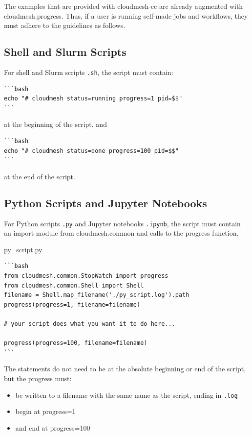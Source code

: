 The examples that are provided with cloudmesh-cc are already augmented
with cloudmesh.progress. Thus, if a user is running self-made jobs and
workflows, they must adhere to the guidelines as follows.

\subsection{Shell and Slurm Scripts}\label{shell-and-slurm-scripts}

For shell and Slurm scripts \texttt{.sh}, the script must contain:

\begin{verbatim}
```bash
echo "# cloudmesh status=running progress=1 pid=$$"
```
\end{verbatim}

at the beginning of the script, and

\begin{verbatim}
```bash
echo "# cloudmesh status=done progress=100 pid=$$"
```
\end{verbatim}

at the end of the script.

\subsection{Python Scripts and Jupyter
Notebooks}\label{python-scripts-and-jupyter-notebooks}

For Python scripts \texttt{.py} and Jupyter notebooks \texttt{.ipynb},
the script must contain an import module from cloudmesh.common and calls
to the progress function.

py\_script.py

\begin{verbatim}
```bash
from cloudmesh.common.StopWatch import progress
from cloudmesh.common.Shell import Shell
filename = Shell.map_filename('./py_script.log').path
progress(progress=1, filename=filename)

# your script does what you want it to do here...

progress(progress=100, filename=filename)
```
\end{verbatim}

The statements do not need to be at the absolute beginning or end of the
script, but the progress must:

\begin{itemize}
\tightlist
\item
  be written to a filename with the same name as the script, ending in
  \texttt{.log}
\item
  begin at progress=1
\item
  and end at progress=100
\end{itemize}
